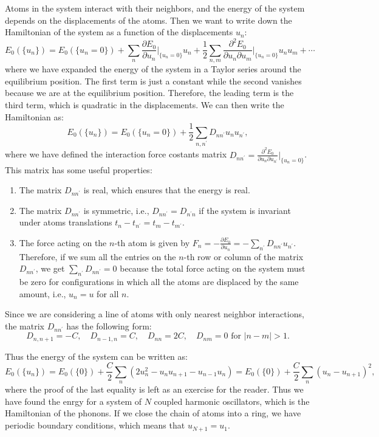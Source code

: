 Atoms in the system interact with their neighbors, and the energy of the system depends on the displacements of the atoms. Then we want to write down the Hamiltonian of the system as a function of the displacements \(u_n\):
\[
    E_0(\{u_n\}) = E_0(\{u_n = 0\}) + \sum_{n} \frac{\partial E_0}{\partial u_n} \big|_{\{u_n = 0\}} u_n + \frac{1}{2} \sum_{n,m} \frac{\partial^2 E_0}{\partial u_n \partial u_m} \big|_{\{u_n = 0\}} u_n u_m + \cdots
\]
where we have expanded the energy of the system in a Taylor series around the equilibrium position. The first term is just a constant while the second vanishes because we are at the equilibrium position. Therefore, the leading term is the third term, which is quadratic in the displacements. We can then write the Hamiltonian as:
\[
    E_0(\{u_n\}) = E_0(\{u_n = 0\}) + \frac{1}{2} \sum_{n,n^{\prime}} D_{nn^{\prime}} u_n u_{n^{\prime}},
\]
where we have defined the interaction force costants matrix \(D_{nn^{\prime}} = \frac{\partial^2 E_0}{\partial u_n \partial u_{n^{\prime}}} \big|_{\{u_n = 0\}}\). This matrix has some useful properties:
\begin{enumerate}
    \item The matrix \(D_{nn^{\prime}}\) is real, which ensures that the energy is real.
    \item The matrix \(D_{nn^{\prime}}\) is symmetric, i.e., \(D_{nn^{\prime}} = D_{n^{\prime}n}\) if the system is invariant under atoms translations \(t_n - t_{n^{\prime}} = t_m - t_{m^{\prime}}\).
    \item The force acting on the $n$-th atom is given by \(F_n = -\frac{\partial E_0}{\partial u_n} = -\sum_{n^{\prime}} D_{nn^{\prime}} u_{n^{\prime}}\). Therefore, if we sum all the entries on the $n$-th row or column of the matrix \(D_{nn^{\prime}}\), we get \(\sum_{n^{\prime}} D_{nn^{\prime}} = 0\) because the total force acting on the system must be zero for configurations in which all the atoms are displaced by the same amount, i.e., \(u_n = u\) for all $n$.
\end{enumerate}

Since we are considering a line of atoms with only nearest neighbor interactions, the matrix \(D_{nn^{\prime}}\) has the following form:
\[
    D_{n, n+1} = -C, \quad D_{n-1,n} = C, \quad D_{nn} = 2C, \quad D_{nm} = 0 \text{ for } |n-m| > 1.
\]

Thus the energy of the system can be written as:
\[
    E_0(\{u_n\}) = E_0(\{0\}) + \frac{C}{2} \sum_{n} (2u_n^2 - u_n u_{n+1} - u_{n-1} u_n) = E_0(\{0\}) + \frac{C}{2} \sum_{n} (u_n - u_{n+1})^2,
\]
where the proof of the last equality is left as an exercise for the reader. Thus we have found the enrgy for a system of \(N\) coupled harmonic oscillators, which is the Hamiltonian of the phonons. If we close the chain of atoms into a ring, we have periodic boundary conditions, which means that \(u_{N+1} = u_1\).

